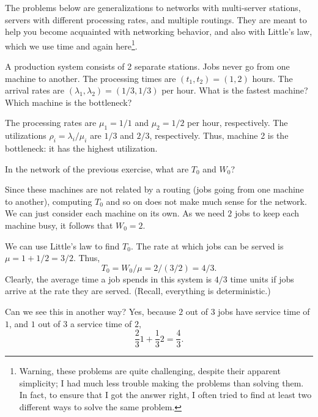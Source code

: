 The problems below are generalizations to networks with multi-server
stations, servers with different processing rates, and multiple
routings. They are meant to help you become acquainted with networking
behavior, and also with Little's law, which we use time and again
here\footnote{Warning, these problems are quite challenging, despite their apparent simplicity; I had much less trouble making the problems than solving them. In fact, to ensure that
I got the answer right, I often tried to find at least two different ways to
solve the same problem.}.

\begin{exercise}
  A production system consists of 2 separate stations. Jobs never go
  from one machine to another. The processing times are
  $(t_1, t_2) = (1, 2)$ hours. The arrival rates are
  $(\lambda_1, \lambda_2) = (1/3, 1/3)$ per hour. What is the fastest
  machine? Which machine is the bottleneck? 
  \begin{solution}
    The processing rates are $\mu_1=1/1$ and $\mu_2 = 1/2$ per hour,
    respectively. The utilizations $\rho_i=\lambda_i/\mu_i$ are $1/3$
    and $2/3$, respectively. Thus, machine 2 is the bottleneck: it has
    the highest utilization.
  \end{solution}
\end{exercise}

\begin{exercise}
In the network of the previous exercise, what are $T_0$ and $W_0$? 
  \begin{solution}
Since these machines are not related by a routing (jobs going from
    one machine to another), computing $T_0$ and so on does not make
    much sense for the network. We can just consider each machine on
    its own. As we need $2$ jobs to keep each machine busy, it
    follows that $W_0=2$. 

We can use Little's law to find $T_0$. The rate at which jobs can be served is $\mu = 1+1/2 = 3/2$. Thus, 
\begin{equation*}
  T_0 = W_0/\mu = 2/(3/2)=4/3.
\end{equation*}
Clearly, the average time a job spends in this system is $4/3$ time units
if jobs arrive at the rate they are served. (Recall, everything is
deterministic.)

Can we see this in another way? Yes, because $2$ out of $3$ jobs have service time of $1$, and $1$ out of $3$ a service time of $2$,
\begin{equation*}
  \frac23 1 + \frac 1 3 2 = \frac 4 3.
\end{equation*}
  \end{solution}
\end{exercise}



